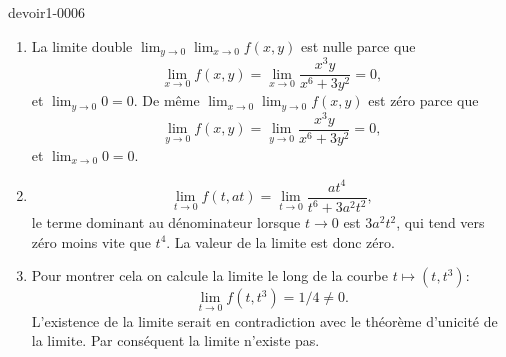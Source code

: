 \begin{corrige}{devoir1-0006}
  \begin{enumerate}
  \item La limite double $\displaystyle \lim_{y\to 0}\lim_{x\to 0} f(x,y)$ est nulle parce que  
    \begin{equation}
      \lim_{x\to 0} f(x,y)=\lim_{x\to 0}\frac{x^3y}{x^6+3y^2}=0,
    \end{equation}
    et $\lim_{y\to 0} 0=0$. De même $\displaystyle \lim_{x\to 0}\lim_{y\to 0} f(x,y)$ est zéro parce que 
    \begin{equation}
      \lim_{y\to 0} f(x,y)=\lim_{y\to 0}\frac{x^3y}{x^6+3y^2}=0,
    \end{equation}
    et $\lim_{x\to 0} 0=0$.
  \item 
    \begin{equation}
       \lim_{t\to 0}f(t,at)=\lim_{t\to 0}\frac{at^4}{t^6+3a^2t^2},
    \end{equation}
    le terme dominant  au dénominateur lorsque $t \to 0$ est $3a^2t^2$, qui tend vers zéro moins vite que $t^4$. La valeur de la limite est donc zéro.

  \item
      Pour montrer cela on calcule la limite le long de la courbe $t\mapsto (t, t^3)$:
      \begin{equation}
        \lim_{t\to 0} f(t,t^3)= 1/4\neq 0.
      \end{equation}
     L'existence de la limite serait en contradiction avec le théorème d'unicité de la limite. Par conséquent la limite n'existe pas. 

  \end{enumerate}
\end{corrige}
